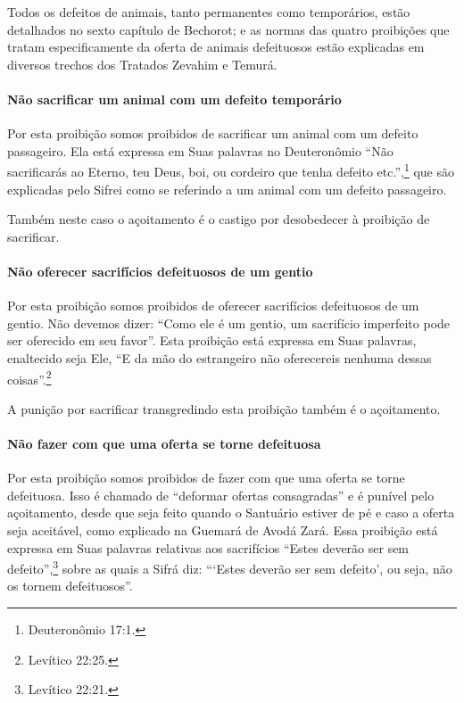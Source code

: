 \begin{multicols}{2}
Todos os defeitos de animais, tanto permanentes como temporários, estão
detalhados no sexto capítulo de Bechorot\starr; e as normas das quatro
proibições que tratam especificamente da oferta de animais defeituosos
estão explicadas em diversos trechos dos Tratados Zevahim\starr{} e Temurá\starr.

\paragraph{Não sacrificar um animal com um defeito temporário}

Por esta proibição somos proibidos de sacrificar um animal com um
defeito passageiro. Ela está expressa em Suas palavras no Deuteronômio
``Não sacrificarás ao Eterno, teu Deus, boi, ou cordeiro que tenha
defeito etc.'',\footnote{Deuteronômio 17:1.} que são explicadas pelo Sifrei\starr{}
como se referindo a um animal com um defeito passageiro.

Também neste caso o açoitamento é o castigo por desobedecer à proibição
de sacrificar.


\paragraph{Não oferecer sacrifícios defeituosos de um gentio}

Por esta proibição somos proibidos de oferecer sacrifícios defeituosos
de um gentio. Não devemos dizer: ``Como ele é um gentio, um sacrifício
imperfeito pode ser oferecido em seu favor''. Esta proibição está
expressa em Suas palavras, enaltecido seja Ele, ``E da mão do
estrangeiro não oferecereis nenhuma dessas coisas''.\footnote{Levítico 22:25.}

A punição por sacrificar transgredindo esta proibição também é o
açoitamento.

\paragraph{Não fazer com que uma oferta se torne defeituosa}

Por esta proibição somos proibidos de fazer com que uma oferta se torne
defeituosa. Isso é chamado de ``deformar ofertas consagradas'' e é
punível pelo açoitamento, desde que seja feito quando o Santuário
estiver de pé e caso a oferta seja aceitável, como explicado na Guemará\starr{}
de Avodá Zará\starr. Essa proibição está expressa em Suas palavras relativas
aos sacrifícios ``Estes deverão ser sem defeito'',\footnote{Levítico 22:21.}
sobre as quais a Sifrá\starr{} diz: ```Estes deverão ser sem defeito', ou seja,
não os tornem defeituosos''.


\end{multicols}
